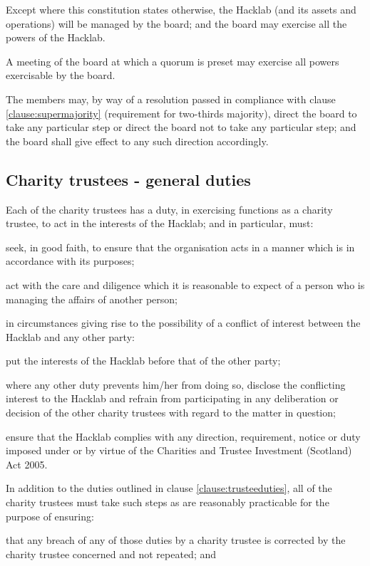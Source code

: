 \documentclass{article}
\begin{document}
\clause Except where this constitution states otherwise, the
Hacklab (and its assets and operations) will be managed by the
board; and the board may exercise all the powers of the Hacklab.

\clause A meeting of the board at which a quorum is preset may
exercise all powers exercisable by the board.

\clause The members may, by way of a resolution passed in compliance
with clause \ref{clause:supermajority} (requirement for two-thirds
majority), direct the board to take any particular step or direct the
board not to take any particular step; and the board shall give effect
to any such direction accordingly.

\subsection{Charity trustees - general duties}

\clause\label{clause:trusteeduties}Each of the charity trustees has a duty, in exercising
functions as a charity trustee, to act in the interests of the
Hacklab; and in particular, must:

\subclause seek, in good faith, to ensure that the organisation acts
in a manner which is in accordance with its purposes;

\subclause act with the care and diligence which it is reasonable to
expect of a person who is managing the affairs of another person;

\subclause in circumstances giving rise to the possibility of a
conflict of interest between the Hacklab and any other party:

\subclause put the interests of the Hacklab before that of the
other party;

\subsubclause where any other duty prevents him/her from doing so,
disclose the conflicting interest to the Hacklab and refrain from
participating in any deliberation or decision of the other charity
trustees with regard to the matter in question;

\subclause ensure that the Hacklab complies with any direction,
requirement, notice or duty imposed under or by virtue of the
Charities and Trustee Investment (Scotland) Act 2005.

\clause In addition to the duties outlined in clause
\ref{clause:trusteeduties}, all of the charity trustees must take such 
steps as are reasonably practicable for the purpose of ensuring:

\subclause that any breach of any of those duties by a charity trustee
is corrected by the charity trustee concerned and not repeated; and
\end{document}
